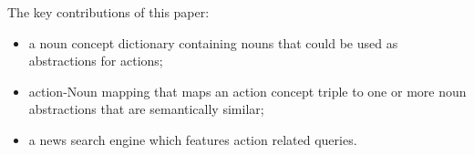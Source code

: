 The key contributions of this paper: 
\begin{itemize}
\item a noun concept dictionary containing nouns that could be used as abstractions for actions;
\item action-Noun mapping that maps an action concept triple to one or more
    noun abstractions that are semantically similar;
\item a news search engine which features action related queries. 
\end{itemize}

